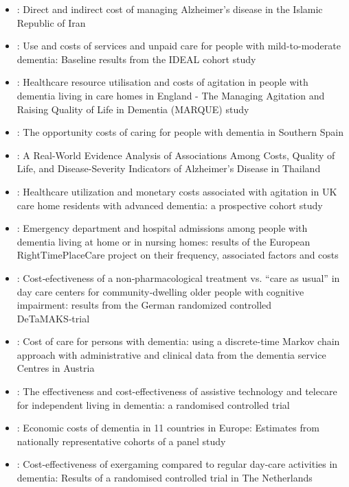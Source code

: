 \documentclass[12pt]{article}
\begin{document}
\begin{itemize}
\begin{itemize}
        \item \cite{aajami2019direct}: Direct and indirect cost of managing Alzheimer’s disease in the Islamic Republic of Iran
        \item \cite{henderson2019use}: Use and costs of services and unpaid care for people with mild-to-moderate dementia: Baseline results from the IDEAL cohort study
        \item \cite{panca2019healthcare}: Healthcare resource utilisation and costs of agitation in people with dementia living in care homes in England - The Managing Agitation and Raising Quality of Life in Dementia (MARQUE) study
        \item \cite{reina2019opportunity}: The opportunity costs of caring for people with dementia in Southern Spain
        \item \cite{kongpakwattana2019real}: A Real-World Evidence Analysis of Associations Among Costs, Quality of Life, and Disease-Severity Indicators of Alzheimer’s Disease in Thailand
        \item \cite{gola2020healthcare}: Healthcare utilization and monetary costs associated with agitation in UK care home residents with advanced dementia: a prospective cohort study
        \item \cite{afonso2020emergency}: Emergency department and hospital admissions among people with dementia living at home or in nursing homes: results of the European RightTimePlaceCare project on their frequency, associated factors and costs
        \item \cite{steinbeisser2020cost}: Cost‑efectiveness of a non‑pharmacological treatment vs. “care as usual” in day care centers for community‑dwelling older people with cognitive impairment: results from the German randomized controlled DeTaMAKS‑trial
        \item \cite{braun2020cost}: Cost of care for persons with dementia: using a discrete-time Markov chain approach with administrative and clinical data from the dementia service Centres in Austria
        \item \cite{howard2021effectiveness}: The effectiveness and cost-effectiveness of assistive technology and telecare for independent living in dementia: a randomised controlled trial
        \item \cite{meijer2022economic}: Economic costs of dementia in 11 countries in Europe: Estimates from nationally representative cohorts of a panel study
        \item \cite{van2022cost}: Cost-effectiveness of exergaming compared to regular day-care activities in dementia: Results of a randomised controlled trial in The Netherlands

\end{itemize}
\end{itemize}
\end{document}
